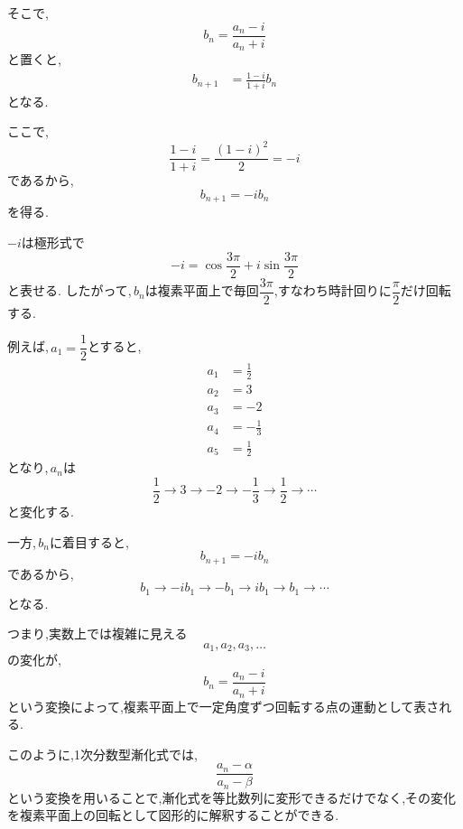   そこで,
  \[
    b_n=\frac{a_n-i}{a_n+i}
  \]
  と置くと,
  \begin{align*}
    b_{n+1}
    &=
    \frac{1- i}{1+i}b_n
  \end{align*}
  となる.

  ここで,
  \[
    \frac{1-i}{1+i}
    =
    \frac{(1-i)^2}{2}
    =-i
  \]
  であるから,
  \[
    b_{n+1}=-ib_n
  \]
  を得る.

  $-i$は極形式で
  \[
    -i=\cos\frac{3\pi}{2}+i\sin\frac{3\pi}{2}
  \]
  と表せる.
  したがって,\,$b_n$は複素平面上で毎回$\dfrac{3\pi}{2}$,すなわち時計回りに$\dfrac{\pi}{2}$だけ回転する.

  例えば,\,$a_1=\dfrac12$とすると,
  \begin{align*}
    a_1&=\frac12\\
    a_2&=3\\
    a_3&=-2\\
    a_4&=-\frac13\\
    a_5&=\frac12
  \end{align*}
  となり,\,$a_n$は
  \[
    \frac12\longrightarrow3\longrightarrow-2
    \longrightarrow-\frac13\longrightarrow\frac12\longrightarrow\cdots
  \]
  と変化する.

  一方,\,$b_n$に着目すると,
  \[
    b_{n+1}=-ib_n
  \]
  であるから,
  \[
    b_1\longrightarrow-ib_1\longrightarrow-b_1
    \longrightarrow ib_1\longrightarrow b_1\longrightarrow\cdots
  \]
  となる.

  つまり,実数上では複雑に見える
  \[
    a_1,a_2,a_3,\ldots
  \]
  の変化が,
  \[
    b_n=\frac{a_n-i}{a_n+i}
  \]
  という変換によって,複素平面上で一定角度ずつ回転する点の運動として表される.

  このように,1次分数型漸化式では,
  \[
    \frac{a_n-\alpha}{a_n-\beta}
  \]
  という変換を用いることで,漸化式を等比数列に変形できるだけでなく,その変化を複素平面上の回転として図形的に解釈することができる.
